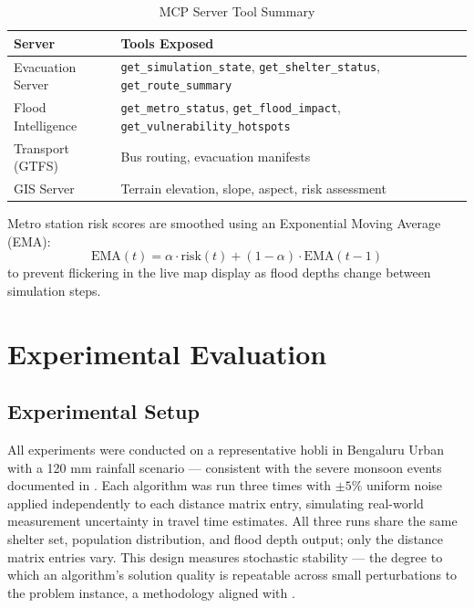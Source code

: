 \documentclass[journal]{IEEEtran}
\begin{document}
\begin{table}[H]
  \centering
  \caption{MCP Server Tool Summary}
  \label{tab:mcp}
  \begin{tabular}{@{}p{3.2cm}p{4.8cm}@{}}
    \toprule
    \textbf{Server} & \textbf{Tools Exposed} \\
    \midrule
    Evacuation Server  & \texttt{get\_simulation\_state}, \texttt{get\_shelter\_status},
                         \texttt{get\_route\_summary} \\
    Flood Intelligence & \texttt{get\_metro\_status}, \texttt{get\_flood\_impact},
                         \texttt{get\_vulnerability\_hotspots} \\
    Transport (GTFS)   & Bus routing, evacuation manifests \\
    GIS Server         & Terrain elevation, slope, aspect, risk assessment \\
    \bottomrule
  \end{tabular}
\end{table}

Metro station risk scores are smoothed using an Exponential Moving Average (EMA):
\begin{equation}
  \text{EMA}(t) = \alpha \cdot \text{risk}(t) + (1-\alpha) \cdot \text{EMA}(t-1)
  \label{eq:ema}
\end{equation}
to prevent flickering in the live map display as flood depths change between simulation
steps.

\section{Experimental Evaluation}
\label{sec:eval}

\subsection{Experimental Setup}

All experiments were conducted on a representative hobli in Bengaluru Urban with a 120 mm
rainfall scenario — consistent with the severe monsoon events documented in
\cite{mujumdar2021bengaluru}. Each algorithm was run three times with $\pm 5\%$ uniform
noise applied independently to each distance matrix entry, simulating real-world measurement
uncertainty in travel time estimates. All three runs share the same shelter set, population
distribution, and flood depth output; only the distance matrix entries vary. This design
measures stochastic stability — the degree to which an algorithm's solution quality is
repeatable across small perturbations to the problem instance, a methodology aligned with
\cite{li2025metaheuristic}.
\end{document}
